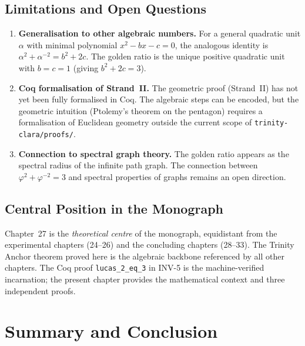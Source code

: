 \subsection{Limitations and Open Questions}

\begin{enumerate}
  \item \textbf{Generalisation to other algebraic numbers.}
        For a general quadratic unit $\alpha$ with minimal
        polynomial $x^{2}-bx-c=0$, the analogous identity is
        $\alpha^{2}+\alpha^{-2} = b^{2}+2c$.
        The golden ratio is the unique positive quadratic unit
        with $b=c=1$ (giving $b^{2}+2c=3$).

  \item \textbf{Coq formalisation of Strand~II.}
        The geometric proof (Strand~II) has not yet been fully
        formalised in Coq.
        The algebraic steps can be encoded, but the geometric
        intuition (Ptolemy's theorem on the pentagon) requires
        a formalisation of Euclidean geometry outside the current
        scope of \texttt{trinity-clara/proofs/}.

  \item \textbf{Connection to spectral graph theory.}
        The golden ratio appears as the spectral radius of the
        infinite path graph.
        The connection between $\varphi^{2}+\varphi^{-2}=3$ and
        spectral properties of graphs remains an open direction.
\end{enumerate}

\subsection{Central Position in the Monograph}

Chapter~27 is the \emph{theoretical centre} of the monograph,
equidistant from the experimental chapters (24--26) and the
concluding chapters (28--33).
The Trinity Anchor theorem proved here is the algebraic
backbone referenced by all other chapters.
The Coq proof \texttt{lucas\_2\_eq\_3} in INV-5 is the
machine-verified incarnation; the present chapter provides
the mathematical context and three independent proofs.


\section{Summary and Conclusion}\label{sec:summary}

